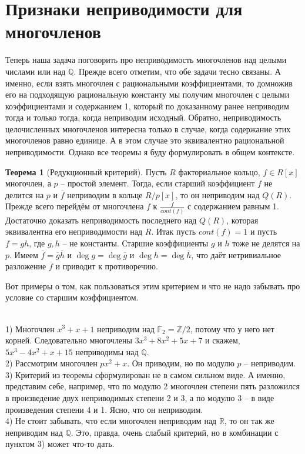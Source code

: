 \documentclass[10pt,a4paper,oneside]{book}
\theoremstyle{definition}
\newtheorem{thm}{{\color{red!40!black} Теорема}}
\newcommand{\mb}[1]{\mathbb{#1}}
\newcommand{\ovl}{\overline}
\def\exm{\noindent {\bf Примеры:}}
\def\thrm{\begin{thm}}
\def\ethrm{\end{thm}}
\begin{document}
\section{Признаки неприводимости для многочленов}

Теперь наша задача поговорить про неприводимость многочленов над целыми числами или над $\mb Q$. 
Прежде всего отметим, что обе задачи тесно связаны. А именно, если взять многочлен с рациональными коэффициентами, то домножив его на подходящую рациональную константу мы получим многочлен с целыми коэффициентами и содержанием 1, который по доказанному ранее неприводим тогда и только тогда, когда неприводим исходный. Обратно, неприводимость целочисленных многочленов интересна только в случае, когда содержание этих многочленов равно единице. А в этом случае это эквивалентно рациональной неприводимости. Однако все теоремы я буду формулировать в общем контексте.



\thrm[Редукционный критерий] Пусть $R$ факториальное кольцо, $f \in  R[x]$ многочлен, а $p$ -- простой элемент. Тогда, если старший коэффициент $f$ не делится на $p$ и $\ovl{f}$ неприводим в кольце $R/p[x]$, то он неприводим над $Q(R)$. 
\proof Прежде всего перейдём от многочлена $f$ к $\frac{f}{cont(f)}$ с содержанием равным 1. Достаточно доказать неприводимость  последнего над $Q(R)$, которая эквивалентна его неприводимости над $R$. Итак пусть $cont(f)=1$ и пусть $f=gh$, где $g,h$ --  не константы. Старшие коэффициенты $g$ и $h$ тоже не делятся на $p$. Имеем $\ovl{f}= \ovl{g}\ovl{h}$ и $\deg g = \deg \ovl{g}$ и $\deg h = \deg \ovl{h}$, что даёт нетривиальное разложение $\ovl{f}$ и приводит к противоречию.
\endproof
\ethrm

Вот примеры о том, как пользоваться этим критерием и что не надо забывать про условие со старшим коэффициентом. 


\exm\\
1) Многочлен $x^3+x+1$ неприводим над $\mb F_2=\mb Z/2$, потому что у него нет корней. Следовательно многочлены $3x^3+8x^2+5x+7$ и скажем, $5x^3-4x^2+x+15$ неприводимы над $\mb Q$.\\
2) Рассмотрим многочлен $px^2+x$. Он приводим, но по модулю $p$ -- неприводим.\\
3) Критерий из теоремы сформулирован не в самом сильном виде. А именно, представим себе, например, что по модулю 2 многочлен степени пять разложился в произведение двух неприводимых степени 2 и 3, а по модулю 3 -- в виде произведения степени 4 и 1. Ясно, что он неприводим.\\
4) Не стоит забывать, что если многочлен неприводим над $\mb R$, то он так же неприводим над $\mb Q$. Это, правда, очень слабый критерий, но в комбинации с пунктом 3) может что-то дать.\\
\end{document}
